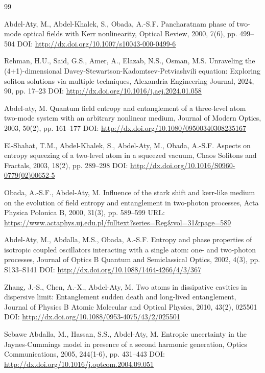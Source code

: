 \documentclass[10pt]{NSP1}
\numberwithin{equation}{section}
\begin{document}
\begin{thebibliography}{99}

 Abdel-Aty, M., Abdel-Khalek, S., Obada, A.-S.F.
Pancharatnam phase of two-mode optical fields with Kerr nonlinearity, Optical Review, 2000, 7(6), pp. 499--504 DOI: \url{http://dx.doi.org/10.1007/s10043-000-0499-6}

 Rehman, H.U., Said, G.S., Amer, A., Elazab, N.S., Osman, M.S.
Unraveling the (4+1)-dimensional Davey-Stewartson-Kadomtsev-Petviashvili equation: Exploring soliton solutions via multiple techniques, Alexandria Engineering Journal, 2024, 90, pp. 17--23 DOI: \url{http://dx.doi.org/10.1016/j.aej.2024.01.058}

 Abdel-aty, M.
Quantum field entropy and entanglement of a three-level atom two-mode system with an arbitrary nonlinear medium, Journal of Modern Optics, 2003, 50(2), pp. 161--177 DOI: \url{http://dx.doi.org/10.1080/09500340308235167}

 El-Shahat, T.M., Abdel-Khalek, S., Abdel-Aty, M., Obada, A.-S.F.
Aspects on entropy squeezing of a two-level atom in a squeezed vacuum, Chaos Solitons and Fractals, 2003, 18(2), pp. 289--298 DOI: \url{http://dx.doi.org/10.1016/S0960-0779(02)00652-5}

 Obada, A.-S.F., Abdel-Aty, M.
Influence of the stark shift and kerr-like medium on the evolution of field entropy and entanglement in two-photon processes, Acta Physica Polonica B, 2000, 31(3), pp. 589--599 URL: \url{https://www.actaphys.uj.edu.pl/fulltext?series=Reg&vol=31&page=589}

 Abdel-Aty, M., Abdalla, M.S., Obada, A.-S.F.
Entropy and phase properties of isotropic coupled oscillators interacting with a single atom: one- and two-photon processes, Journal of Optics B Quantum and Semiclassical Optics, 2002, 4(3), pp. S133--S141 DOI: \url{http://dx.doi.org/10.1088/1464-4266/4/3/367}

 Zhang, J.-S., Chen, A.-X., Abdel-Aty, M.
Two atoms in dissipative cavities in dispersive limit: Entanglement sudden death and long-lived entanglement, Journal of Physics B Atomic Molecular and Optical Physics, 2010, 43(2), 025501 DOI: \url{http://dx.doi.org/10.1088/0953-4075/43/2/025501}

 Sebawe Abdalla, M., Hassan, S.S., Abdel-Aty, M.
Entropic uncertainty in the Jaynes-Cummings model in presence of a second harmonic generation, Optics Communications, 2005, 244(1-6), pp. 431--443 DOI: \url{http://dx.doi.org/10.1016/j.optcom.2004.09.051}


\end{thebibliography}
\end{document}
